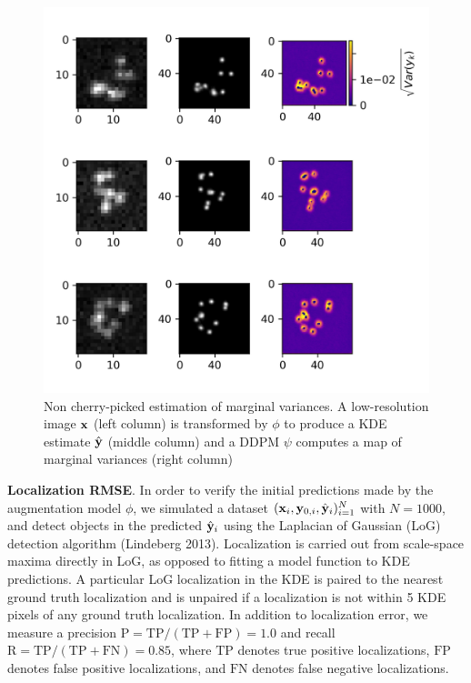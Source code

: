 \documentclass{article}
\begin{document}
\begin{figure}
\centering
\includegraphics[scale=1.1]{Bayes.png}
\caption{Non cherry-picked estimation of marginal variances. A low-resolution image $\bold{x}$ (left column) is transformed by $\phi$ to produce a KDE estimate $\hat{\bold{y}}$ (middle column) and a DDPM $\psi$ computes a map of marginal variances (right column)}
\end{figure}

\textbf{Localization RMSE}. In order to verify the initial predictions made by the augmentation model $\phi$, we simulated a dataset $(\bold{x}_i,\bold{y}_{0,i},\hat{\bold{y}}_{i})_{i=1}^{N}$ with $N=1000$, and  detect objects in the predicted $\hat{\bold{y}}_{i}$ using the Laplacian of Gaussian (LoG) detection algorithm (Lindeberg 2013). Localization is carried out from scale-space maxima directly in LoG, as opposed to fitting a model function to KDE predictions. A particular LoG localization in the KDE is paired to the nearest ground truth localization and is unpaired if a localization is not within 5 KDE pixels of any ground truth localization. In addition to localization error, we measure a precision $\mathrm{P = TP/(TP + FP)} = 1.0$ and recall $\mathrm{R = TP/(TP + FN)} = 0.85$, where $\mathrm{TP}$ denotes true positive localizations, $\mathrm{FP}$ denotes false positive localizations, and $\mathrm{FN}$ denotes false negative localizations.
\end{document}
